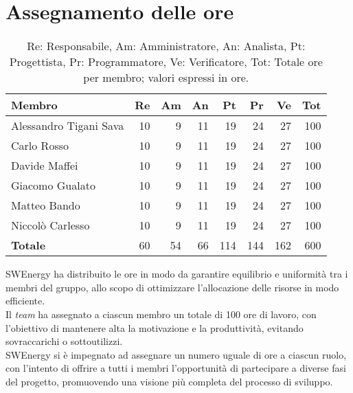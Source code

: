 \section{Assegnamento delle ore}

\begin{table}[H]
	\renewcommand{\arraystretch}{1.5}
	\centering
	\begin{tabular}{l|r|r|r|r|r|r|r}
		\textbf{Membro} & \textbf{Re} & \textbf{Am} & \textbf{An} & \textbf{Pt}
		& \textbf{Pr} & \textbf{Ve} & \textbf{Tot} \\
		\hline
		Alessandro Tigani Sava 	&	10 &  9 & 11 & 19 &  24 &  27 &  100 \\
		Carlo Rosso 			&	10 &  9 & 11 & 19 &  24 &  27 &  100 \\
		Davide Maffei			&	10 &  9 & 11 & 19 &  24 &  27 &  100 \\
		Giacomo Gualato 		&	10 &  9 & 11 & 19 &  24 &  27 &  100 \\
		Matteo Bando 			&	10 &  9 & 11 & 19 &  24 &  27 &  100 \\
		Niccolò Carlesso 		&	10 &  9 & 11 & 19 &  24 &  27 &  100 \\
		\hline
		\textbf{Totale} 		&	60 & 54 & 66 & 114 & 144 & 162 & 600 \\
	\end{tabular}

	\caption{Re: Responsabile, Am: Amministratore, An: Analista, Pt:
	Progettista, Pr: Programmatore, Ve: Verificatore, Tot: Totale ore per 
	membro; valori espressi in ore.}
\end{table}

SWEnergy ha distribuito le ore in modo da garantire equilibrio e uniformità 
tra i membri del gruppo, allo scopo di ottimizzare l'allocazione delle 
risorse in modo efficiente. \\
Il \textit{team} ha assegnato a ciascun membro un totale di 100 ore di lavoro, 
con l'obiettivo di mantenere alta la motivazione e la produttività, 
evitando sovraccarichi o sottoutilizzi. \\
SWEnergy si è impegnato ad assegnare un numero uguale di ore a ciascun ruolo, 
con l'intento di offrire a tutti i membri l'opportunità di partecipare a 
diverse fasi del progetto, promuovendo una visione più completa del processo di sviluppo.
